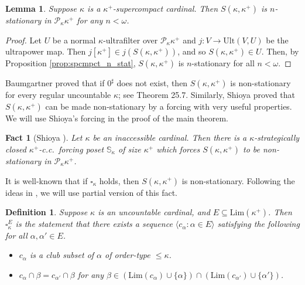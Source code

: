 \documentclass[a4paper,12pt,reqno,oneside]{amsart}
\theoremstyle{plain}
\newtheorem{lemma}[theorem]{Lemma}
\newtheorem*{definition*}{Definition}
\newtheorem{fact}[theorem]{Fact}
\newcommand{\mrm}{\mathrm}
\newcommand{\mbb}{\mathbb}
\newcommand{\mcal}{\mathcal}
\newcommand{\ltpt}{\mathrm{Lim}}
\begin{document}

\begin{lemma} \label{lem:S_stat_spcmpct} 
Suppose $\kappa$ is a $\kappa^+$-supercompact cardinal. Then $S(\kappa, \kappa^{+})$ is $n$-stationary in $\mcal{P}_{\kappa}{\kappa^+}$ for any $n < \omega$.
\end{lemma}


\begin{proof} %
Let $U$ be a normal $\kappa$-ultrafilter over $\mcal{P}_\kappa \kappa^+$ and $j : V \to \mrm{Ult} ( V , U )$ be the ultrapower map. Then $j[ \kappa^+ ] \in j( S( \kappa , \kappa^+ ) )$, and so $S( \kappa , \kappa^+ ) \in U$. Then, by Proposition \ref{prop:spcmpct_n_stat}, $S( \kappa , \kappa^+ )$ is $n$-stationary for all $n < \omega$.
\end{proof} %


Baumgartner proved that if $0^\sharp$ does not exist, then $S( \kappa , \kappa^+ )$ is non-stationary for every regular uncountable $\kappa$; see \cite{K} Theorem 25.7. Similarly, Shioya proved that $S( \kappa , \kappa^+ )$ can be made non-stationary by a forcing with very useful properties. We will use Shioya's forcing in the proof of the main theorem.


\begin{fact}[Shioya \cite{Sh}]\label{fact:Shioya}
Let $\kappa$ be an inaccessible cardinal. Then there is a $\kappa$-strategically closed $\kappa^+$-c.c.~forcing poset $\mbb{S}_\kappa$ of size $\kappa^+$ which forces $S( \kappa , \kappa^+ )$ to be non-stationary in $\mcal{P}_\kappa \kappa^+$.
\end{fact}


It is well-known that if $\square_\kappa$ holds, then $S( \kappa , \kappa^+ )$ is non-stationary. Following the ideas in \cite{Kr,S}, we will use partial version of this fact.

\begin{definition*}
Suppose $\kappa$ is an uncountable cardinal, and $E \subseteq \ltpt ( \kappa^+ )$. Then $\square_{\kappa}^E$ is the statement that there exists a sequence $\langle c_{\alpha} : \alpha \in E \rangle$ satisfying the following for all $\alpha , \alpha ' \in E$.
\begin{itemize}
\item[(i)] $c_{\alpha}$ is a club subset of $\alpha$ of order-type $\leq \kappa$.
\item[(ii)] $c_{\alpha} \cap \beta = c_{\alpha'} \cap\beta$ for any $\beta \in ( \ltpt (c_{\alpha}) \cup \{\alpha\} ) \cap ( \ltpt (c_{\alpha'}) \cup \{\alpha'\} )$.
\end{itemize}
\end{definition*}
\end{document}
